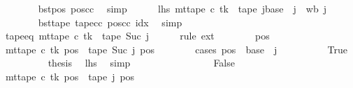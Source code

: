 \begin{isabellebody}
\ \ \ \ \ \ \isamarkupfalse%
\ bst{\isacharunderscore}{\kern0pt}pos\ pos{\isacharunderscore}{\kern0pt}cc\ \isamarkupfalse%
\ simp\isanewline
\ \ \ \ \isamarkupfalse%
\ lhs{\isacharcolon}{\kern0pt}\ {\isachardoublequoteopen}mt{\isacharunderscore}{\kern0pt}tape\ c{\isacharprime}{\kern0pt}{\isacharprime}{\kern0pt}\ tk\ {\isacharequal}{\kern0pt}\ {\isacharparenleft}{\kern0pt}{\isacharquery}{\kern0pt}tape\ j{\isacharparenright}{\kern0pt}{\isacharparenleft}{\kern0pt}base\ {\isacharplus}{\kern0pt}\ j\ {\isacharcolon}{\kern0pt}{\isacharequal}{\kern0pt}\ {\isacharquery}{\kern0pt}wb\ j{\isacharparenright}{\kern0pt}{\isachardoublequoteclose}\isanewline
\ \ \ \ \ \ \isamarkupfalse%
\ bst{\isacharunderscore}{\kern0pt}tape\ tape{\isacharunderscore}{\kern0pt}cc\ pos{\isacharunderscore}{\kern0pt}cc\ idx\ \isamarkupfalse%
\ simp\isanewline
\ \ \ \ \isamarkupfalse%
\ tape{\isacharunderscore}{\kern0pt}eq{\isacharcolon}{\kern0pt}\ {\isachardoublequoteopen}mt{\isacharunderscore}{\kern0pt}tape\ c{\isacharprime}{\kern0pt}{\isacharprime}{\kern0pt}\ tk\ {\isacharequal}{\kern0pt}\ {\isacharquery}{\kern0pt}tape\ {\isacharparenleft}{\kern0pt}Suc\ j{\isacharparenright}{\kern0pt}{\isachardoublequoteclose}\isanewline
\ \ \ \ \isamarkupfalse%
\ {\isacharparenleft}{\kern0pt}rule\ ext{\isacharparenright}{\kern0pt}\isanewline
\ \ \ \ \ \ \isamarkupfalse%
\ pos\isanewline
\ \ \ \ \ \ \isamarkupfalse%
\ {\isachardoublequoteopen}mt{\isacharunderscore}{\kern0pt}tape\ c{\isacharprime}{\kern0pt}{\isacharprime}{\kern0pt}\ tk\ pos\ {\isacharequal}{\kern0pt}\ {\isacharquery}{\kern0pt}tape\ {\isacharparenleft}{\kern0pt}Suc\ j{\isacharparenright}{\kern0pt}\ pos{\isachardoublequoteclose}\isanewline
\ \ \ \ \ \ \isamarkupfalse%
\ {\isacharparenleft}{\kern0pt}cases\ {\isachardoublequoteopen}pos\ {\isacharequal}{\kern0pt}\ base\ {\isacharplus}{\kern0pt}\ j{\isachardoublequoteclose}{\isacharparenright}{\kern0pt}\isanewline
\ \ \ \ \ \ \ \ \isamarkupfalse%
\ True\isanewline
\ \ \ \ \ \ \ \ \isamarkupfalse%
\ {\isacharquery}{\kern0pt}thesis\ \isamarkupfalse%
\ lhs\ \isamarkupfalse%
\ simp\isanewline
\ \ \ \ \ \ \isamarkupfalse%
\isanewline
\ \ \ \ \ \ \ \ \isamarkupfalse%
\ False\isanewline
\ \ \ \ \ \ \ \ \isamarkupfalse%
\ {\isachardoublequoteopen}mt{\isacharunderscore}{\kern0pt}tape\ c{\isacharprime}{\kern0pt}{\isacharprime}{\kern0pt}\ tk\ pos\ {\isacharequal}{\kern0pt}\ {\isacharquery}{\kern0pt}tape\ j\ pos{\isachardoublequoteclose}\ \isamarkupfalse%

\end{isabellebody}
